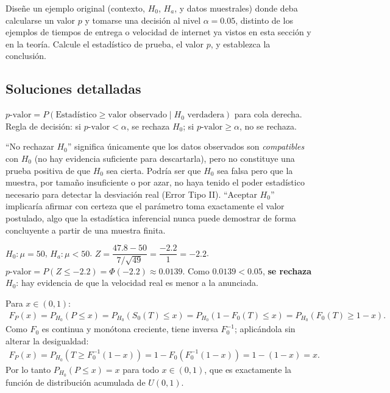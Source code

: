 \begin{problema}
	\label{prob:de31e8f}
	Diseñe un ejemplo original (contexto, $H_0$, $H_a$, y datos muestrales) donde deba calcularse un valor $p$ y tomarse una decisión al nivel $\alpha=0.05$, distinto de los ejemplos de tiempos de entrega o velocidad de internet ya vistos en esta sección y en la teoría. Calcule el estadístico de prueba, el valor $p$, y establezca la conclusión.
\end{problema}

\subsection*{Soluciones detalladas}

\begin{solproblema}[prob:f1273a2]
	$p\text{-valor} = P(\text{Estadístico}\ge\text{valor observado}\mid H_0\text{ verdadera})$ para cola derecha. Regla de decisión: si $p\text{-valor}<\alpha$, se rechaza $H_0$; si $p\text{-valor}\ge\alpha$, no se rechaza.
\end{solproblema}

\begin{solproblema}[prob:ed08255]
	``No rechazar $H_0$'' significa únicamente que los datos observados son \emph{compatibles} con $H_0$ (no hay evidencia suficiente para descartarla), pero no constituye una prueba positiva de que $H_0$ sea cierta. Podría ser que $H_0$ sea falsa pero que la muestra, por tamaño insuficiente o por azar, no haya tenido el poder estadístico necesario para detectar la desviación real (Error Tipo II). ``Aceptar $H_0$'' implicaría afirmar con certeza que el parámetro toma exactamente el valor postulado, algo que la estadística inferencial nunca puede demostrar de forma concluyente a partir de una muestra finita.
\end{solproblema}

\begin{solproblema}[prob:28d9ae6]
	$H_0:\mu=50$, $H_a:\mu<50$. $Z = \dfrac{47.8-50}{7/\sqrt{49}} = \dfrac{-2.2}{1} = -2.2$. $p\text{-valor} = P(Z\le-2.2) = \Phi(-2.2)\approx0.0139$. Como $0.0139<0.05$, \textbf{se rechaza} $H_0$: hay evidencia de que la velocidad real es menor a la anunciada.
\end{solproblema}

\begin{solproblema}
	Para $x\in(0,1)$:
	\begin{align*}
		F_P(x) = P_{H_0}(P\le x) = P_{H_0}(S_0(T)\le x) = P_{H_0}(1-F_0(T)\le x) = P_{H_0}(F_0(T)\ge1-x).
	\end{align*}
	Como $F_0$ es continua y monótona creciente, tiene inversa $F_0^{-1}$; aplicándola sin alterar la desigualdad:
	\begin{align*}
		F_P(x) = P_{H_0}\left(T\ge F_0^{-1}(1-x)\right) = 1-F_0\left(F_0^{-1}(1-x)\right) = 1-(1-x) = x.
	\end{align*}
	Por lo tanto $P_{H_0}(P\le x)=x$ para todo $x\in(0,1)$, que es exactamente la función de distribución acumulada de $U(0,1)$.
\end{solproblema}

